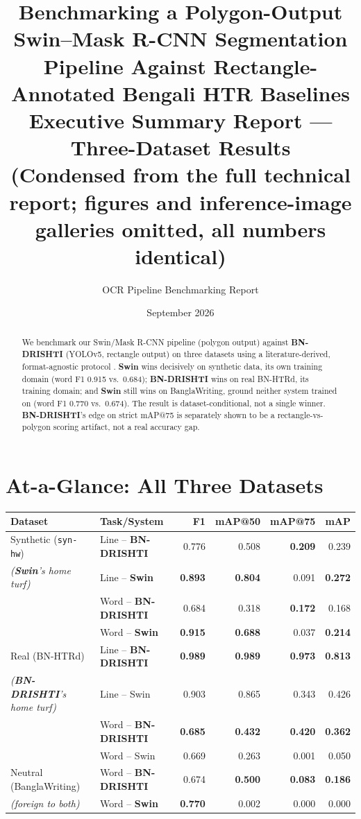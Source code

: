 \documentclass[10pt]{article}
\title{\textbf{\large Benchmarking a Polygon-Output Swin--Mask R-CNN Segmentation Pipeline
Against Rectangle-Annotated Bengali HTR Baselines}\\[2pt]
\normalsize Executive Summary Report --- Three-Dataset Results\\[1pt]
\footnotesize (Condensed from the full technical report; figures and inference-image
galleries omitted, all numbers identical)}
\author{OCR Pipeline Benchmarking Report}
\date{September 2026}
\newcommand{\swin}{\textbf{Swin}}
\newcommand{\bnd}{\textbf{BN-DRISHTI}}
\begin{document}
\maketitle
\vspace{-1.5em}

\begin{abstract}
\noindent We benchmark our Swin/Mask R-CNN pipeline (polygon output) against \bnd{}
\cite{jubaer2023bndrishti} (YOLOv5, rectangle output) on three datasets using a
literature-derived, format-agnostic protocol \cite{wolf2006detEval}. \swin{} wins
decisively on synthetic data, its own training domain (word F1 0.915 vs.\ 0.684);
\bnd{} wins on real BN-HTRd, its training domain; and \swin{} still wins on
BanglaWriting, ground neither system trained on (word F1 0.770 vs.\ 0.674). The
result is dataset-conditional, not a single winner. \bnd's edge on strict mAP@75 is
separately shown to be a rectangle-vs-polygon scoring artifact, not a real accuracy
gap.
\end{abstract}

\section*{At-a-Glance: All Three Datasets}

\begin{table}[H]
\centering
\footnotesize
\begin{tabular}{@{}llrrrr@{}}
\toprule
Dataset & Task/System & F1 & mAP@50 & mAP@75 & mAP \\
\midrule
Synthetic (\texttt{syn-hw}) & Line -- \bnd{}       & 0.776 & 0.508 & \textbf{0.209} & 0.239 \\
\emph{(\swin's home turf)} & Line -- \textbf{Swin}  & \textbf{0.893} & \textbf{0.804} & 0.091 & \textbf{0.272} \\
 & Word -- \bnd{}        & 0.684 & 0.318 & \textbf{0.172} & 0.168 \\
 & Word -- \textbf{Swin}  & \textbf{0.915} & \textbf{0.688} & 0.037 & \textbf{0.214} \\
\midrule
Real (BN-HTRd) & Line -- \textbf{\bnd{}}        & \textbf{0.989} & \textbf{0.989} & \textbf{0.973} & \textbf{0.813} \\
\emph{(\bnd's home turf)} & Line -- Swin           & 0.903 & 0.865 & 0.343 & 0.426 \\
          & Word -- \textbf{\bnd{}}        & \textbf{0.685} & \textbf{0.432} & \textbf{0.420} & \textbf{0.362} \\
          & Word -- Swin           & 0.669 & 0.263 & 0.001 & 0.050 \\
\midrule
Neutral (BanglaWriting) & Word -- \bnd{}        & 0.674 & \textbf{0.500} & \textbf{0.083} & \textbf{0.186} \\
\emph{(foreign to both)} & Word -- \textbf{Swin}  & \textbf{0.770} & 0.002 & 0.000 & 0.000 \\
\bottomrule
\end{tabular}
\end{table}
\end{document}
